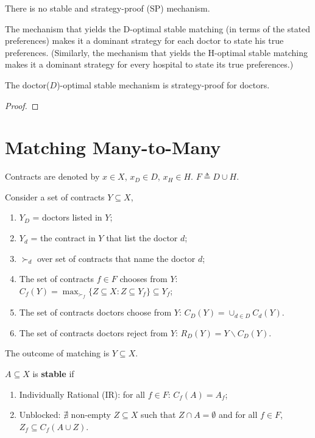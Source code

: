 \documentclass[11pt]{elegantbook}
\begin{document}
\begin{theorem}
    There is no stable and strategy-proof (SP) mechanism.
\end{theorem}

The mechanism that yields the D-optimal stable matching (in terms of the stated preferences) makes it a dominant strategy for each doctor to state his true preferences. (Similarly, the mechanism that yields the H-optimal stable matching makes it a dominant strategy for every hospital to state its true preferences.)
\begin{theorem}
    The doctor($D$)-optimal stable mechanism is strategy-proof for doctors.
\end{theorem}
\begin{proof}
\end{proof}


\section{Matching Many-to-Many}
Contracts are denoted by $x\in X$, $x_D\in D$, $x_H\in H$. $F\triangleq D\cup H$.

Consider a set of contracts $Y\subseteq X$,
\begin{enumerate}[$\circ$]
    \item $Y_D$ = doctors listed in $Y$;
    \item $Y_d$ = the contract in $Y$ that list the doctor $d$;
    \item $\succ_d$ over set of contracts that name the doctor $d$;
    \item The set of contracts $f\in F$ chooses from $Y$: $C_f(Y)=\max_{\succ_f}\{Z\subseteq X:Z\subseteq Y_f\}\subseteq Y_f$;
    \item The set of contracts doctors choose from $Y$: $C_D(Y)=\cup_{d\in D}C_d(Y)$.
    \item The set of contracts doctors reject from $Y$: $R_D(Y)=Y\backslash C_D(Y)$.
\end{enumerate}
The outcome of matching is $Y\subseteq X$.

\begin{definition}
    \normalfont
    $A\subseteq X$ is \textbf{stable} if
    \begin{enumerate}[$\circ$]
        \item Individually Rational (IR): for all $f\in F$: $C_f(A)=A_f$;
        \item Unblocked: $\nexists$ non-empty $Z\subseteq X$ such that $Z\cap A=\emptyset $ and for all $f\in F$, $Z_f\subseteq C_f(A\cup Z)$.
    \end{enumerate}
\end{definition}
\end{document}
